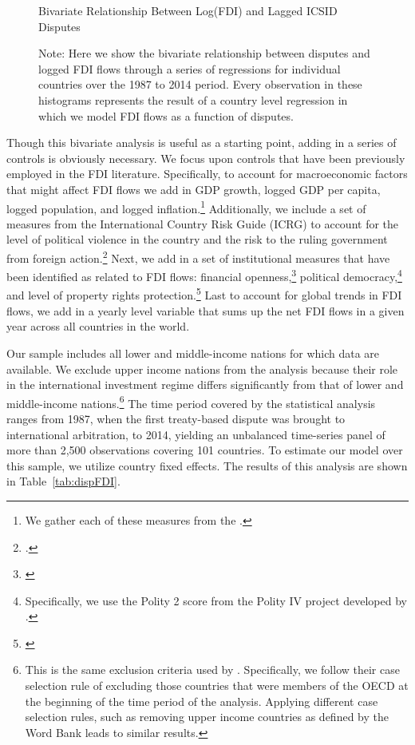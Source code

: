 \documentclass[12pt,onesided]{amsart}
\begin{document}
\begin{figure}[ht]
	\centering
	\caption{Bivariate Relationship Between Log(FDI) and Lagged ICSID Disputes}
	\label{fig:corrFDI}
	\resizebox{1\textwidth}{!}{}	
	\caption*{Note: Here we show the bivariate relationship between disputes and logged FDI flows through a series of regressions for individual countries over the 1987 to 2014 period. Every observation in these histograms represents the result of a country level regression in which we model FDI flows as a function of disputes.}
\end{figure}
\FloatBarrier

Though this bivariate analysis is useful as a starting point, adding in a series of controls is obviously necessary. We focus upon controls that have been previously employed in the FDI literature. Specifically, to account for macroeconomic factors that might affect FDI flows we add in GDP growth, logged GDP per capita, logged population, and logged inflation.\footnote{We gather each of these measures from the \citet{worldbank:2013}.} Additionally, we include a set of measures from the International Country Risk Guide (ICRG) to account for the level of political violence in the country and the risk to the ruling government from foreign action.\footnote{\citet{prs:2013}.} Next, we add in a set of institutional measures that have been identified as related to FDI flows: financial openness,\footnote{\citet{chinn:ito:2008}} political democracy,\footnote{Specifically, we use the Polity 2 score from the Polity IV project developed by \citet{marshall2013polity}.} and level of property rights protection.\footnote{\citet{prs:2013}} Last to account for global trends in FDI flows, we add in a yearly level variable that sums up the net FDI flows in a given year across all countries in the world.

Our sample includes all lower and middle-income nations for which data are available. We exclude upper income nations from the analysis because their role in the international investment regime differs significantly from that of lower and middle-income nations.\footnote{This is the same exclusion criteria used by \citet{allee:peinhardt:2011}. Specifically, we follow their case selection rule of excluding those countries that were members of the OECD at the beginning of the time period of the analysis. Applying different case selection rules, such as removing upper income countries as defined by the Word Bank leads to similar results.} The time period covered by the statistical analysis ranges from 1987, when the first treaty-based dispute was brought to international arbitration, to 2014, yielding an unbalanced time-series panel of more than 2,500 observations covering 101 countries. To estimate our model over this sample, we utilize country fixed effects. The results of this analysis are shown in Table~\ref{tab:dispFDI}.
\end{document}
